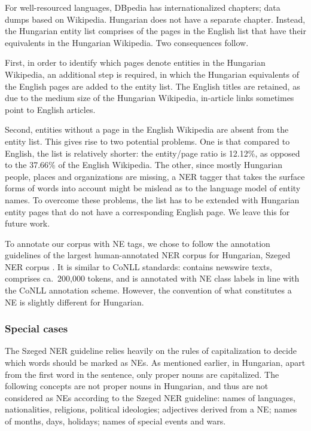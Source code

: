 \documentclass[11pt]{article}
\begin{document}
For well-resourced languages, DBpedia has internationalized chapters; data dumps based on Wikipedia. Hungarian does not have a separate chapter. Instead, the Hungarian entity list comprises of the pages in the English list that have their equivalents in the Hungarian Wikipedia. Two consequences follow.

First, in order to identify which pages denote entities in the Hungarian Wikipedia, an additional step is required, in which the Hungarian equivalents of the English pages are added to the entity list. The English titles are retained, as due to the medium size of the Hungarian Wikipedia, in-article links sometimes point to English articles.

Second, entities without a page in the English Wikipedia are absent from the entity list. This gives rise to two potential problems. One is that compared to English, the list is relatively shorter: the entity/page ratio is 12.12\%, as opposed to the 37.66\% of the English Wikipedia. The other, since mostly Hungarian people, places and organizations are missing, a NER tagger that takes the surface forms of words into account might be mislead as to the language model of entity names. To overcome these problems, the list has to be extended with Hungarian entity pages that do not have a corresponding English page. We leave this for future work.

To annotate our corpus with NE tags, we chose to follow the annotation guidelines of the largest human-annotated NER corpus for Hungarian, Szeged NER corpus \cite{Szarvas:06}. It is similar to CoNLL standards: contains newswire texts, comprises ca.~200,000 tokens, and is annotated with NE class labels in line with the CoNLL annotation scheme. However, the convention of what constitutes a NE is slightly different for Hungarian. 

\subsubsection{Special cases}

The Szeged NER guideline relies heavily on the rules of capitalization to decide which words should be marked as NEs. As mentioned earlier, in Hungarian, apart from the first word in the sentence, only proper nouns are capitalized. The following concepts are not proper nouns in Hungarian, and thus are not considered as NEs according to the Szeged NER guideline: names of languages, nationalities, religions, political ideologies; adjectives derived from a NE; names of months, days, holidays; names of special events and wars.
\end{document}
